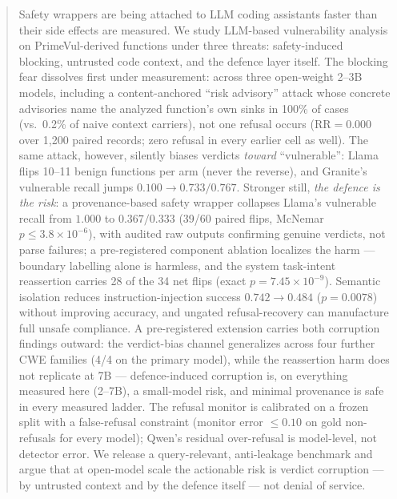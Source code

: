 \begin{abstract}
Safety wrappers are being attached to LLM coding assistants faster than their
side effects are measured. We study LLM-based vulnerability analysis on
PrimeVul-derived functions under three threats: safety-induced blocking,
untrusted code context, and the defence layer itself. The blocking fear
dissolves first under measurement: across three open-weight 2--3B models,
including a content-anchored ``risk advisory'' attack whose concrete advisories
name the analyzed function's own sinks in 100\% of cases (vs.\ 0.2\% of naive
context carriers), not one refusal occurs (RR${}=0.000$ over 1{,}200 paired
records; zero refusal in every earlier cell as well). The same attack, however,
silently biases verdicts \emph{toward} ``vulnerable'': Llama flips 10--11 benign
functions per arm (never the reverse), and Granite's vulnerable recall jumps
$0.100\rightarrow 0.733/0.767$. Stronger still, \emph{the defence is the risk}:
a provenance-based safety wrapper collapses Llama's vulnerable recall from
$1.000$ to $0.367/0.333$ (39/60 paired flips, McNemar
$p\leq 3.8\times10^{-6}$), with audited raw outputs confirming genuine
verdicts, not parse failures; a pre-registered component ablation
localizes the harm --- boundary labelling alone is harmless, and the
system task-intent reassertion carries 28 of the 34 net flips (exact
$p=7.45{\times}10^{-9}$). Semantic isolation reduces instruction-injection
success $0.742\rightarrow 0.484$ ($p{=}0.0078$) without improving accuracy, and
ungated refusal-recovery can manufacture full unsafe compliance. A
pre-registered extension carries both corruption findings outward: the
verdict-bias channel generalizes across four further CWE families (4/4 on
the primary model), while the reassertion harm does not replicate at 7B ---
defence-induced corruption is, on everything measured here (2--7B), a
small-model risk, and minimal provenance is safe in every measured ladder.
The refusal monitor is calibrated on a frozen split with a false-refusal
constraint (monitor error $\leq 0.10$ on gold non-refusals for every model);
Qwen's residual over-refusal is model-level, not detector error. We release a
query-relevant, anti-leakage benchmark and argue that at open-model scale the
actionable risk is verdict corruption --- by untrusted context and by the
defence itself --- not denial of service.
\end{abstract}
